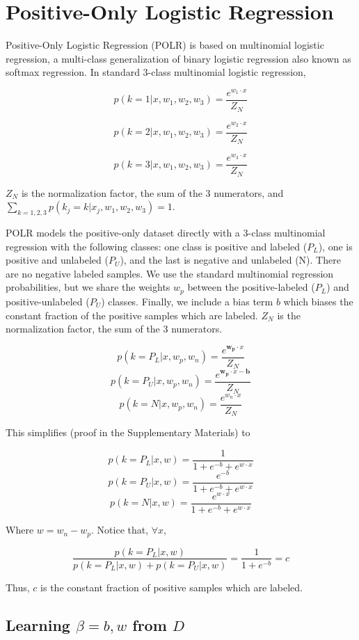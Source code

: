 \documentclass{article}
\begin{document}
\section{Positive-Only Logistic Regression}

Positive-Only Logistic Regression (POLR) is based on multinomial logistic regression, a multi-class generalization of binary logistic regression also known as softmax regression.  In standard 3-class multinomial logistic regression,

$$
p(k=1 | x, w_1, w_2, w_3) =  \frac{e^{w_1 \cdot x}}{Z_N}
$$

$$
p(k=2 | x, w_1, w_2, w_3) =  \frac{e^{w_2 \cdot x}}{Z_N}
$$

$$
p(k=3 | x, w_1, w_2, w_3) =  \frac{e^{w_3 \cdot x}}{Z_N}
$$

$Z_N$ is the normalization factor, the sum of the 3 numerators, and $\sum_{k=1,2,3}{p(k_j=k|x_j, w_1, w_2, w_3)} = 1$.

POLR models the positive-only dataset directly with a 3-class multinomial regression with the following classes: one class is positive and labeled ($P_L$), one is positive and unlabeled ($P_U$), and the last is negative and unlabeled (N).  There are no negative labeled samples.  We use the standard multinomial regression probabilities, but we share the weights $w_p$ between the positive-labeled ($P_L$) and positive-unlabeled ($P_U$) classes. Finally, we include a bias term $b$ which biases the constant fraction of the positive samples which are labeled.  $Z_N$ is the normalization factor, the sum of the 3 numerators.

$$p(k=P_L | x, w_p, w_n) =  \frac{e^{\mathbf{w_p} \cdot x}}{Z_N}$$
$$p(k=P_U | x, w_p, w_n) =  \frac{e^{\mathbf{w_p} \cdot x - \mathbf{b}}}{Z_N}$$
$$p(k=N | x, w_p, w_n) =  \frac{e^{w_n \cdot x}}{Z_N}$$

This simplifies (proof in the Supplementary Materials) to

$$ p(k=P_L | x, w) = \frac{1}{1 + e^{-b} + e^{w \cdot x}}$$
$$ p(k=P_U | x, w) =  \frac{e^{-b}}{1 + e^{-b} + e^{w \cdot x}}$$
$$ p(k=N | x, w) = \frac{e^{w \cdot x}}{1 + e^{-b} + e^{w \cdot x}}$$

Where $w = w_n - w_p$. Notice that, $\forall x$,

$$
\frac{p(k=P_L | x, w)}{p(k=P_L | x, w) + p(k=P_U | x, w)} = \frac{1}{1 + e^{-b}} = c
$$

Thus, $c$ is the constant fraction of positive samples which are labeled.

\subsection{Learning $\beta = b, w$ from $D$}
\end{document}
